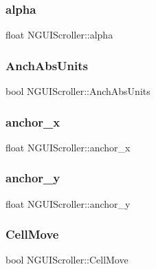 \subsubsection{\texorpdfstring{alpha}{alpha}}
{\footnotesize\ttfamily float N\+G\+U\+I\+Scroller\+::alpha}

\hypertarget{class_n_g_u_i_scroller_a0cb4f0afa1560af36e5329895ff798a3}{}\label{class_n_g_u_i_scroller_a0cb4f0afa1560af36e5329895ff798a3} 
\subsubsection{\texorpdfstring{Anch\+Abs\+Units}{AnchAbsUnits}}
{\footnotesize\ttfamily bool N\+G\+U\+I\+Scroller\+::\+Anch\+Abs\+Units}

\hypertarget{class_n_g_u_i_scroller_acedbadf0efc00a82be7fe0973f590afe}{}\label{class_n_g_u_i_scroller_acedbadf0efc00a82be7fe0973f590afe} 
\subsubsection{\texorpdfstring{anchor\+\_\+x}{anchor\_x}}
{\footnotesize\ttfamily float N\+G\+U\+I\+Scroller\+::anchor\+\_\+x}

\hypertarget{class_n_g_u_i_scroller_ae2fa08666337be3832faae4117c3130a}{}\label{class_n_g_u_i_scroller_ae2fa08666337be3832faae4117c3130a} 
\subsubsection{\texorpdfstring{anchor\+\_\+y}{anchor\_y}}
{\footnotesize\ttfamily float N\+G\+U\+I\+Scroller\+::anchor\+\_\+y}

\hypertarget{class_n_g_u_i_scroller_a7932371668636ba798512ba121695ef2}{}\label{class_n_g_u_i_scroller_a7932371668636ba798512ba121695ef2} 
\subsubsection{\texorpdfstring{Cell\+Move}{CellMove}}
{\footnotesize\ttfamily bool N\+G\+U\+I\+Scroller\+::\+Cell\+Move}

